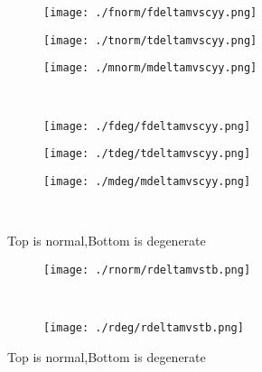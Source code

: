 \documentclass[aps,floats,floatfix,nofootinbib]{revtex4-1}
\begin{document}
\begin{center}
\begin{figure}
\begin{subfigure}{0.3\textwidth}
\texttt{[image: ./fnorm/fdeltamvscyy.png]}
\label{}
\end{subfigure}
\begin{subfigure}{0.3\textwidth}
\texttt{[image: ./tnorm/tdeltamvscyy.png]}
\label{}
\end{subfigure}
\begin{subfigure}{0.3\textwidth}
\texttt{[image: ./mnorm/mdeltamvscyy.png]}
\label{}
\end{subfigure}\\
\begin{subfigure}{0.3\textwidth}
\texttt{[image: ./fdeg/fdeltamvscyy.png]}
\label{}
\end{subfigure}
\begin{subfigure}{0.3\textwidth}
\texttt{[image: ./tdeg/tdeltamvscyy.png]}
\label{}
\end{subfigure}
\begin{subfigure}{0.3\textwidth}
\texttt{[image: ./mdeg/mdeltamvscyy.png]}
\label{}
\end{subfigure}\\
\caption{Top is normal,Bottom is degenerate}
\end{figure}
\end{center}

\begin{center}
\begin{figure}
\begin{subfigure}{1.0\textwidth}
\texttt{[image: ./rnorm/rdeltamvstb.png]}
\label{}
\end{subfigure}\\
\begin{subfigure}{1.0\textwidth}
\texttt{[image: ./rdeg/rdeltamvstb.png]}
\label{}
\end{subfigure}
\caption{Top is normal,Bottom is degenerate}
\end{figure}
\end{center}
\end{document}
